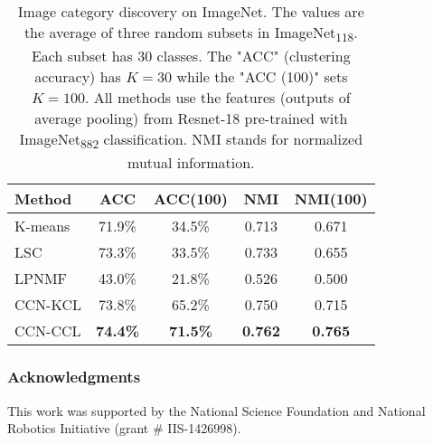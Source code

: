 \documentclass[10pt,twocolumn,letterpaper]{article}
\begin{document}
\begin{table}
\centering
\caption{Image category discovery on ImageNet. The values are the average of three random subsets in ImageNet\textsubscript{118}. Each subset has 30 classes. The "ACC" (clustering accuracy) has $K=30$ while the "ACC (100)" sets $K=100$. All methods use the features (outputs of average pooling) from Resnet-18 pre-trained with ImageNet\textsubscript{882} classification. NMI stands for normalized mutual information.}
\label{tab:corsstask_imagenet}
\begin{tabular}{lcccc}
\toprule
Method & ACC             & ACC(100)        & NMI            & NMI(100)       \\ \midrule
K-means & 71.9\%          & 34.5\%          & 0.713          & 0.671          \\
LSC    & 73.3\%          & 33.5\%          & 0.733          & 0.655          \\
LPNMF  & 43.0\%          & 21.8\%          & 0.526          & 0.500          \\ 
CCN-KCL    & 73.8\% & 65.2\% & 0.750 & 0.715 \\ \midrule
CCN-CCL    & \textbf{74.4\%} & \textbf{71.5\%} & \textbf{0.762} & \textbf{0.765} \\
\bottomrule
\end{tabular}
\end{table}

\subsubsection*{Acknowledgments}
This work was supported by the National Science Foundation and National Robotics Initiative (grant \# IIS-1426998).
\end{document}
